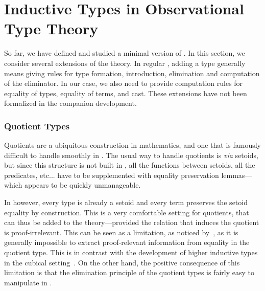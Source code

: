 \setchapterpreamble[u]{\margintoc}
\chapter{Inductive Types in Observational Type Theory}


So far, we have defined and studied a minimal version of \SetoidTT.
%
In this section, we consider several extensions of the theory.
%
In regular \MLTT, adding a type generally means giving rules for type
formation, introduction, elimination and computation of the
eliminator. In our case, we also need to provide computation rules for
equality of types, equality of terms, and cast. These extensions have
not been formalized in the companion \Agda development.

\subsection{Quotient Types}

Quotients are a ubiquitous construction in mathematics, and one that
is famously difficult to handle smoothly in \MLTT.
%
The usual way to handle quotients is \textit{via} setoids, but since
this structure is not built in \MLTT, all the functions between
setoids, all the predicates, etc... have to be supplemented with
equality preservation lemmas---which appears to be quickly unmanageable.

In \SetoidTT however, every type is already a setoid and every term
preserves the setoid equality by construction. This is a very
comfortable setting for quotients, that can thus be added to the
theory---provided the relation that induces the quotient is
proof-irrelevant.
%
This can be seen as a limitation, as noticed
by~, as it is generally
impossible to extract proof-relevant information from equality in
the quotient type. This is in contrast with the development of higher
inductive types in the cubical setting~.
%
On the other hand, the positive consequence of this limitation is
that the elimination principle of the quotient types is fairly easy to
manipulate in \SetoidTT.

